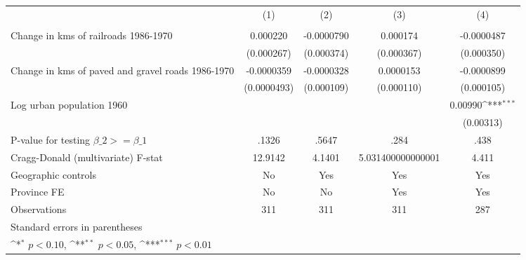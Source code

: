 {
\def\sym#1{\ifmmode^{#1}\else\(^{#1}\)\fi}
\begin{tabular}{l*{4}{c}}
\hline\hline
                &\multicolumn{1}{c}{(1)}&\multicolumn{1}{c}{(2)}&\multicolumn{1}{c}{(3)}&\multicolumn{1}{c}{(4)}\\
                &\multicolumn{1}{c}{}&\multicolumn{1}{c}{}&\multicolumn{1}{c}{}&\multicolumn{1}{c}{}\\
\hline
Change in kms of railroads 1986-1970& 0.000220         &-0.0000790         & 0.000174         &-0.0000487         \\
                &(0.000267)         &(0.000374)         &(0.000367)         &(0.000350)         \\
[1em]
Change in kms of paved and gravel roads 1986-1970&-0.0000359         &-0.0000328         &0.0000153         &-0.0000899         \\
                &(0.0000493)         &(0.000109)         &(0.000110)         &(0.000105)         \\
[1em]
Log urban population 1960&                  &                  &                  &  0.00990\sym{***}\\
                &                  &                  &                  &(0.00313)         \\
\hline
P-value for testing $\beta\_{2} >= \beta\_{1}$&    .1326         &    .5647         &     .284         &     .438         \\
Cragg-Donald (multivariate) F-stat&  12.9142         &   4.1401         &5.031400000000001         &    4.411         \\
Geographic controls&       No         &      Yes         &      Yes         &      Yes         \\
Province FE     &       No         &       No         &      Yes         &      Yes         \\
Observations    &      311         &      311         &      311         &      287         \\
\hline\hline
\multicolumn{5}{l}{\footnotesize Standard errors in parentheses}\\
\multicolumn{5}{l}{\footnotesize \sym{*} \(p<0.10\), \sym{**} \(p<0.05\), \sym{***} \(p<0.01\)}\\
\end{tabular}
}
